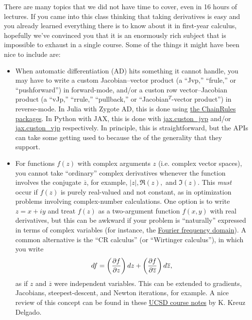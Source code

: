 There are many topics that we did not have time to cover, even in 16 hours of lectures. If you came into this class thinking that taking derivatives is easy and you already learned everything there is to know about it in first-year calculus, hopefully we've convinced you that it is an enormously rich subject that is impossible to exhaust in a single course. Some of the things it might have been nice to include are:
\begin{itemize}
    \item When automatic differentiation (AD) hits something it cannot handle, you may have to write a custom Jacobian--vector product (a ``Jvp,'' ``frule,'' or ``pushforward'') in forward-mode, and/or a custon row vector--Jacobian product (a ``vJp,'' ``rrule,'' ``pullback,'' or ``Jacobian$^T$-vector product'') in reverse-mode. In Julia with Zygote AD, this is done using \href{https://github.com/JuliaDiff/ChainRulesCore.jl}{the ChainRules packages}. In Python with JAX, this is done with \href{https://jax.readthedocs.io/en/latest/_autosummary/jax.custom_jvp.html}{jax.custon\_jvp} and/or \href{https://jax.readthedocs.io/en/latest/_autosummary/jax.custom_vjp.html}{jax.custon\_vjp} respectively. In principle, this is straightforward, but the APIs can take some getting used to because the of the generality that they support.
    \item For functions $f(z)$ with complex arguments $z$ (i.e. complex vector spaces), you cannot take ``ordinary'' complex derivatives whenever the function involves the conjugate $\overline{z}$, for example, $|z|, \Re(z),$ and $\Im(z)$. This \textit{must} occur if $f(z)$ is purely real-valued and not constant, as in optimization problems involving complex-number calculations. One option is to write $z = x+iy$ and treat $f(z)$ as a two-argument function $f(x,y)$ with real derivatives, but this can be awkward if your problem is ``naturally'' expressed in terms of complex variables (for instance, the \href{https://en.wikipedia.org/wiki/Frequency_domain}{Fourier frequency domain}). A common alternative is the ``CR calculus'' (or ``Wirtinger calculus''), in which you write 
    \[
    d f = \left(\frac{\partial f}{\partial z}\right) d z + \left(\frac{\partial f}{\partial \overline{z}}\right)d \overline{z},
    \]
    as if $z$ and $\overline{z}$ were independent variables. This can be extended to gradients, Jacobians, steepest-descent, and Newton iterations, for example. A nice review of this concept can be found in these \href{https://arxiv.org/abs/0906.4835}{UCSD course notes} by K. Kreuz Delgado.

\end{itemize}
